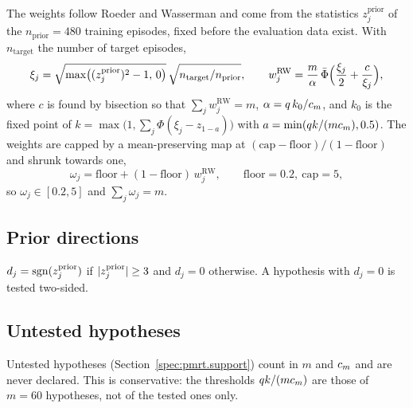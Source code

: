 The weights follow Roeder and Wasserman and come from the statistics $z_j^{\mathrm{prior}}$ of the $n_{\mathrm{prior}} = 480$ training episodes, fixed before the evaluation data exist. With $n_{\mathrm{target}}$ the number of target episodes,
\begin{equation*}
\xi_j = \sqrt{\max\bigl((z_j^{\mathrm{prior}})^2 - 1,\, 0\bigr)}\,\sqrt{n_{\mathrm{target}}/n_{\mathrm{prior}}}, \qquad
w_j^{\mathrm{RW}} = \frac{m}{\alpha}\, \bar\Phi\Bigl(\frac{\xi_j}{2} + \frac{c}{\xi_j}\Bigr),
\end{equation*}
where $c$ is found by bisection so that $\sum_j w_j^{\mathrm{RW}} = m$, $\alpha = q\,k_0/c_m$, and $k_0$ is the fixed point of $k = \max\bigl(1, \sum_j \Phi(\xi_j - z_{1-a})\bigr)$ with $a = \min(q k/(m c_m), 0.5)$. The weights are capped by a mean-preserving map at $(\mathrm{cap} - \mathrm{floor})/(1 - \mathrm{floor})$ and shrunk towards one,
\begin{equation*}
\omega_j = \mathrm{floor} + (1 - \mathrm{floor})\, w_j^{\mathrm{RW}}, \qquad \mathrm{floor} = 0.2,\ \mathrm{cap} = 5,
\end{equation*}
so $\omega_j \in [0.2, 5]$ and $\sum_j \omega_j = m$.


\subsection{Prior directions}
\label{spec:fdr.directions}

$d_j = \mathrm{sgn}(z_j^{\mathrm{prior}})$ if $\lvert z_j^{\mathrm{prior}}\rvert \ge 3$ and $d_j = 0$ otherwise. A hypothesis with $d_j = 0$ is tested two-sided.

\subsection{Untested hypotheses}
\label{spec:fdr.untested}

Untested hypotheses (Section~\ref{spec:pmrt.support}) count in $m$ and $c_m$ and are never declared. This is conservative: the thresholds $q k/(m c_m)$ are those of $m = 60$ hypotheses, not of the tested ones only.
